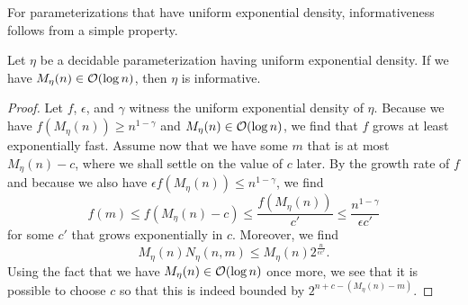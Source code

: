 For parameterizations that have uniform exponential density, informativeness follows from a simple property.
\begin{lemma}
\label{lem:exponentialinformative}
  Let $\eta$ be a decidable parameterization having uniform exponential density.
  If we have $M_\eta(n) \in \operatorname{\mathcal{O}}(\log n)$, then $\eta$ is informative.
\end{lemma}
\begin{proof}
  Let $f$, $\epsilon$, and $\gamma$ witness the uniform exponential density of $\eta$.
  Because we have $f(M_\eta(n)) \ge n^{1 - \gamma}$ and $M_\eta(n) \in \operatorname{\mathcal{O}}(\log n)$, we find that $f$ grows at least exponentially fast.
  Assume now that we have some $m$ that is at most $M_\eta(n) - c$, where we shall settle on the value of $c$ later.
  By the growth rate of $f$ and because we also have $\epsilon f(M_\eta(n)) \le n^{1 - \gamma}$, we find
  \begin{equation*}
    f(m) \le f(M_\eta(n) - c) \le \frac{f(M_\eta(n))}{c'} \le \frac{n^{1 - \gamma}}{\epsilon c'}
  \end{equation*}
  for some $c'$ that grows exponentially in $c$.
  Moreover, we find
  \begin{equation*}
    M_\eta(n) N_\eta(n, m) \le M_\eta(n) 2^{\frac{n}{\epsilon c'}}.
  \end{equation*}
  Using the fact that we have $M_\eta(n) \in \operatorname{\mathcal{O}}(\log n)$ once more, we see that it is possible to choose $c$ so that this is indeed bounded by $2^{n + c - (M_\eta(n) - m)}$.
\end{proof}

